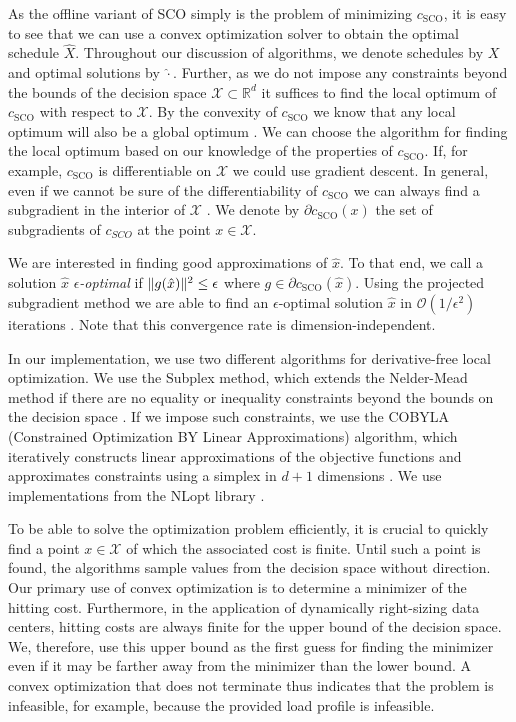 As the offline variant of SCO simply is the problem of minimizing $c_{\text{SCO}}$, it is easy to see that we can use a convex optimization solver to obtain the optimal schedule $\hat{X}$. Throughout our discussion of algorithms, we denote schedules by $X$ and optimal solutions by $\hat{\cdot}$. Further, as we do not impose any constraints beyond the bounds of the decision space $\mathcal{X} \subset \mathbb{R}^d$ it suffices to find the local optimum of $c_{\text{SCO}}$ with respect to $\mathcal{X}$. By the convexity of $c_{\text{SCO}}$ we know that any local optimum will also be a global optimum \cite{Bubeck2015}. We can choose the algorithm for finding the local optimum based on our knowledge of the properties of $c_{\text{SCO}}$. If, for example, $c_{\text{SCO}}$ is differentiable on $\mathcal{X}$ we could use gradient descent. In general, even if we cannot be sure of the differentiability of $c_{\text{SCO}}$ we can always find a subgradient in the interior of $\mathcal{X}$ \cite{Bubeck2015}. We denote by $\partial c_{\text{SCO}}(x)$ the set of subgradients of $c_{SCO}$ at the point $x \in \mathcal{X}$.

We are interested in finding good approximations of $\hat{x}$. To that end, we call a solution $\hat{x}$ \emph{$\epsilon$-optimal} if $\lVert g(\hat{x})\rVert^2 \leq \epsilon$ where $g \in \partial c_{\text{SCO}}(\hat{x})$. Using the projected subgradient method we are able to find an $\epsilon$-optimal solution $\hat{x}$ in $\mathcal{O}(1 / \epsilon^2)$ iterations \cite{Boyd2003}. Note that this convergence rate is dimension-independent.

In our implementation, we use two different algorithms for derivative-free local optimization. We use the Subplex method, which extends the Nelder-Mead method if there are no equality or inequality constraints beyond the bounds on the decision space \cite{Rowan1990}. If we impose such constraints, we use the COBYLA (Constrained Optimization BY Linear Approximations) algorithm, which iteratively constructs linear approximations of the objective functions and approximates constraints using a simplex in $d+1$ dimensions \cite{Powell1994, Powell1998}. We use implementations from the NLopt library \cite{Johnson}.

To be able to solve the optimization problem efficiently, it is crucial to quickly find a point $x \in \mathcal{X}$ of which the associated cost is finite. Until such a point is found, the algorithms sample values from the decision space without direction. Our primary use of convex optimization is to determine a minimizer of the hitting cost. Furthermore, in the application of dynamically right-sizing data centers, hitting costs are always finite for the upper bound of the decision space. We, therefore, use this upper bound as the first guess for finding the minimizer even if it may be farther away from the minimizer than the lower bound. A convex optimization that does not terminate thus indicates that the problem is infeasible, for example, because the provided load profile is infeasible.

